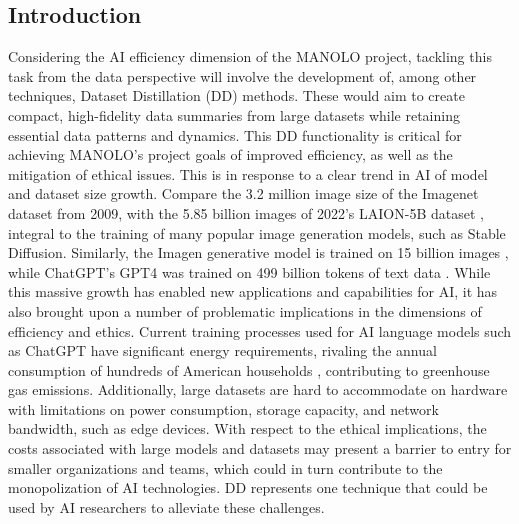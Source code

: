 \subsection{Introduction} \label{introduction}
Considering the AI efficiency dimension of the MANOLO project, tackling this task from the data perspective will involve the development of, among other techniques, Dataset Distillation (DD) methods. These would aim to create compact, high-fidelity data summaries from large datasets while retaining essential data patterns and dynamics. This DD functionality is critical for achieving MANOLO's project goals of improved efficiency, as well as the mitigation of ethical issues. This is in response to a clear trend in AI of model and dataset size growth. Compare the 3.2 million image size of the Imagenet dataset \cite{imagenet} from 2009, with the 5.85 billion images of 2022's LAION-5B dataset \cite{laion}, integral to the training of many popular image generation models, such as Stable Diffusion. Similarly, the Imagen generative model is trained on 15 billion images \cite{imagen}, while ChatGPT's GPT4 was trained on 499 billion tokens of text data \cite{guimaraes2024pre}. While this massive growth has enabled new applications and capabilities for AI, it has also brought upon a number of problematic implications in the dimensions of efficiency and ethics. Current training processes used for  AI language models such as ChatGPT have significant energy requirements, rivaling the annual consumption of hundreds of American households \cite{energyhouseholds}, contributing to greenhouse gas emissions. Additionally, large datasets are hard to accommodate on hardware with limitations on power consumption, storage capacity, and network bandwidth, such as edge devices. With respect to the ethical implications, the costs associated with large models and datasets may present a barrier to entry for smaller organizations and teams, which could in turn contribute to the monopolization of AI technologies. DD represents one technique that could be used by AI researchers to alleviate these challenges.

